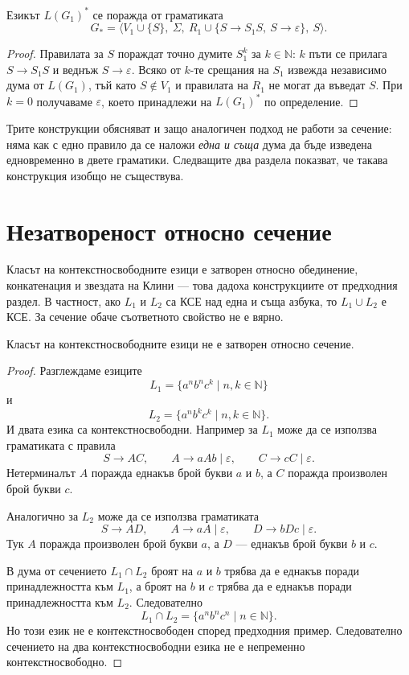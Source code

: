 \begin{prop}
Езикът $L(G_1)^*$ се поражда от граматиката
\[
G_*=\langle V_1\cup\{S\},\ \Sigma,\ R_1\cup\{S\to S_1S,\ S\to\varepsilon\},\ S\rangle .
\]
\end{prop}
\begin{proof}
Правилата за $S$ пораждат точно думите $S_1^k$ за $k\in\mathbb{N}$: $k$ пъти се
прилага $S\to S_1S$ и веднъж $S\to\varepsilon$. Всяко от $k$-те срещания на
$S_1$ извежда независимо дума от $L(G_1)$, тъй като $S\notin V_1$ и правилата на
$R_1$ не могат да въведат $S$. При $k=0$ получаваме $\varepsilon$, което
принадлежи на $L(G_1)^*$ по определение.
\end{proof}

\begin{remark}
Трите конструкции обясняват и защо аналогичен подход не работи за сечение: няма
как с едно правило да се наложи \emph{една и съща} дума да бъде изведена
едновременно в двете граматики. Следващите два раздела показват, че такава
конструкция изобщо не съществува.
\end{remark}

\section{Незатвореност относно сечение}\label{s:5.5}

Класът на контекстносвободните езици е затворен относно обединение, конкатенация и звездата на Клини --- това дадоха конструкциите от предходния раздел. В частност, ако $L_1$ и $L_2$ са КСЕ над една и съща азбука, то $L_1\cup L_2$ е КСЕ. За сечение обаче съответното свойство не е вярно.

\begin{thm}
Класът на контекстносвободните езици не е затворен относно сечение.
\end{thm}

\begin{proof}
Разглеждаме езиците
\[
L_1=\{a^n b^n c^k\mid n,k\in\mathbb{N}\}
\]
и
\[
L_2=\{a^n b^k c^k\mid n,k\in\mathbb{N}\}.
\]
И двата езика са контекстносвободни. Например за $L_1$ може да се използва граматиката с правила
\[
S\to AC,\qquad
A\to aAb\mid\varepsilon,\qquad
C\to cC\mid\varepsilon.
\]
Нетерминалът $A$ поражда еднакъв брой букви $a$ и $b$, а $C$ поражда произволен брой букви $c$.

Аналогично за $L_2$ може да се използва граматиката
\[
S\to AD,\qquad
A\to aA\mid\varepsilon,\qquad
D\to bDc\mid\varepsilon.
\]
Тук $A$ поражда произволен брой букви $a$, а $D$ --- еднакъв брой букви $b$ и $c$.

В дума от сечението $L_1\cap L_2$ броят на $a$ и $b$ трябва да е еднакъв поради принадлежността към $L_1$, а броят на $b$ и $c$ трябва да е еднакъв поради принадлежността към $L_2$. Следователно
\[
L_1\cap L_2
=
\{a^n b^n c^n\mid n\in\mathbb{N}\}.
\]
Но този език не е контекстносвободен според предходния пример. Следователно сечението на два контекстносвободни езика не е непременно контекстносвободно.
\end{proof}

